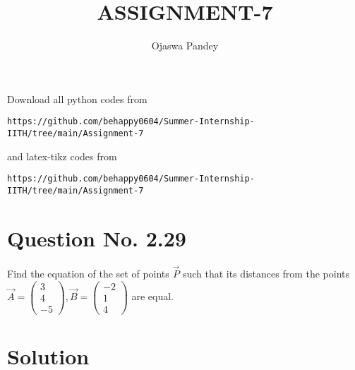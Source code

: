 \documentclass[journal,12pt,twocolumn]{IEEEtran}
\newcommand{\myvec}[1]{\ensuremath{\begin{pmatrix}#1\end{pmatrix}}}
\begin{document}
     \def\topbox#1{\raisebox{-\baselineskip}[0in][0in]{#1}}
     \def\midbox#1{\raisebox{-0.5\baselineskip}[0in][0in]{#1}}
\vspace{3cm}
\title{ASSIGNMENT-7}
\author{Ojaswa Pandey}
\maketitle
\newpage
\bigskip
\renewcommand{\thefigure}{\theenumi}
\renewcommand{\thetable}{\theenumi}
Download all python codes from 
\begin{lstlisting}
https://github.com/behappy0604/Summer-Internship-IITH/tree/main/Assignment-7
\end{lstlisting}
%
and latex-tikz codes from 
%
\begin{lstlisting}
https://github.com/behappy0604/Summer-Internship-IITH/tree/main/Assignment-7
\end{lstlisting}
%
\section{Question No. 2.29} 
 Find the equation of the set of points $\vec{P}$ such that its distances from the points
$
\vec{A}=\myvec{3\\4\\-5}, 
\vec{B}=\myvec{-2\\1\\4}
$
are equal. 
\section{Solution}
\end{document}
